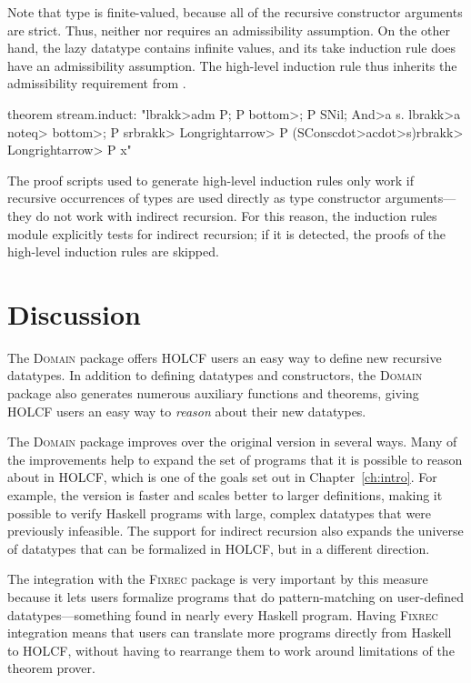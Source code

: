 Note that type  is finite-valued, because all of the recursive constructor arguments are strict. Thus, neither  nor  requires an admissibility assumption. On the other hand, the lazy  datatype contains infinite values, and its take induction rule  does have an admissibility assumption. The high-level induction rule  thus inherits the admissibility requirement from .

\begin{isacode}
theorem stream.induct:
  "\<lbrakk>adm P; P \<bottom>; P SNil; \<And>a s. \<lbrakk>a \<noteq> \<bottom>; P s\<rbrakk> \<Longrightarrow> P (SCons\<cdot>a\<cdot>s)\<rbrakk> \<Longrightarrow> P x"
\end{isacode}

The proof scripts used to generate high-level induction rules only work if recursive occurrences of types are used directly as type constructor arguments---they do not work with indirect recursion. For this reason, the induction rules module explicitly tests for indirect recursion; if it is detected, the proofs of the high-level induction rules are skipped.

\section{Discussion}
\label{sec:domain-discussion}

The \textsc{Domain} package offers HOLCF users an easy way to define new recursive datatypes. In addition to defining datatypes and constructors, the \textsc{Domain} package also generates numerous auxiliary functions and theorems, giving HOLCF users an easy way to \emph{reason} about their new datatypes.

The  \textsc{Domain} package improves over the original  version in several ways. Many of the improvements help to expand the set of programs that it is possible to reason about in HOLCF, which is one of the goals set out in Chapter~\ref{ch:intro}. For example, the  version is faster and scales better to larger definitions, making it possible to verify Haskell programs with large, complex datatypes that were previously infeasible. The support for indirect recursion also expands the universe of datatypes that can be formalized in HOLCF, but in a different direction.

The integration with the \textsc{Fixrec} package is very important by this measure because it lets users formalize programs that do pattern-matching on user-defined datatypes---something found in nearly every Haskell program. Having \textsc{Fixrec} integration means that users can translate more programs directly from Haskell to HOLCF, without having to rearrange them to work around limitations of the theorem prover.


